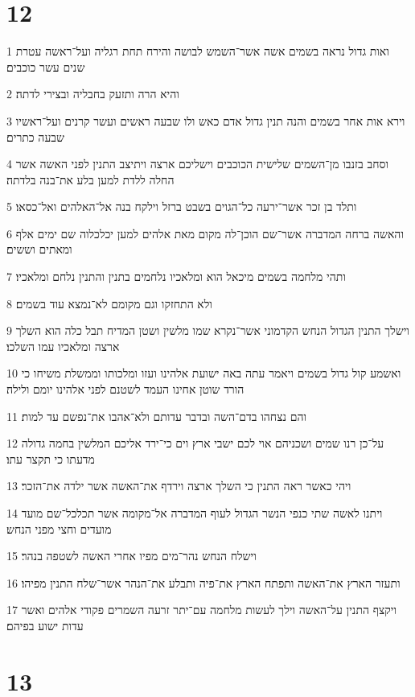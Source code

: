 \chapter{12}

\par 1 ואות גדול נראה בשמים אשה אשר־השמש לבושה והירח תחת רגליה ועל־ראשה עטרת שנים עשר כוכבים׃
\par 2 והיא הרה ותזעק בחבליה ובצירי לדתה׃
\par 3 וירא אות אחר בשמים והנה תנין גדול אדם כאש ולו שבעה ראשים ועשר קרנים ועל־ראשיו שבעה כתרים׃
\par 4 וסחב בזנבו מן־השמים שלישית הכוכבים וישליכם ארצה ויתיצב התנין לפני האשה אשר החלה ללדת למען בלע את־בנה בלדתה׃
\par 5 ותלד בן זכר אשר־ירעה כל־הגוים בשבט ברזל וילקח בנה אל־האלהים ואל־כסאו׃
\par 6 והאשה ברחה המדברה אשר־שם הוכן־לה מקום מאת אלהים למען יכלכלוה שם ימים אלף ומאתים וששים׃
\par 7 ותהי מלחמה בשמים מיכאל הוא ומלאכיו נלחמים בתנין והתנין נלחם ומלאכיו׃
\par 8 ולא התחזקו וגם מקומם לא־נמצא עוד בשמים׃
\par 9 וישלך התנין הגדול הנחש הקדמוני אשר־נקרא שמו מלשין ושטן המדיח תבל כלה הוא השלך ארצה ומלאכיו עמו השלכו׃
\par 10 ואשמע קול גדול בשמים ויאמר עתה באה ישועת אלהינו ועזו ומלכותו וממשלת משיחו כי הורד שוטן אחינו העמד לשטנם לפני אלהינו יומם ולילה׃
\par 11 והם נצחהו בדם־השה ובדבר עדותם ולא־אהבו את־נפשם עד למות׃
\par 12 על־כן רנו שמים ושכניהם אוי לכם ישבי ארץ וים כי־ירד אליכם המלשין בחמה גדולה מדעתו כי תקצר עתו׃
\par 13 ויהי כאשר ראה התנין כי השלך ארצה וירדף את־האשה אשר ילדה את־הזכר׃
\par 14 ויתנו לאשה שתי כנפי הנשר הגדול לעוף המדברה אל־מקומה אשר תכלכל־שם מועד מועדים וחצי מפני הנחש׃
\par 15 וישלח הנחש נהר־מים מפיו אחרי האשה לשטפה בנהר׃
\par 16 ותעזר הארץ את־האשה ותפתח הארץ את־פיה ותבלע את־הנהר אשר־שלח התנין מפיהו׃
\par 17 ויקצף התנין על־האשה וילך לעשות מלחמה עם־יתר זרעה השמרים פקודי אלהים ואשר עדות ישוע בפיהם׃

\chapter{13}

